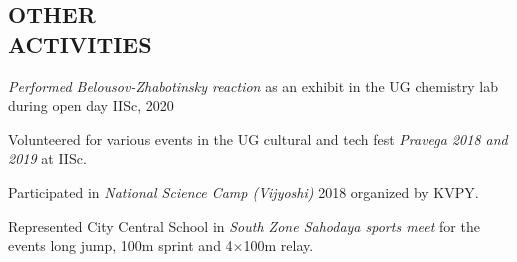 \documentclass[margin, 10pt]{res} %
\begin{document}
\begin{resume}
\section{OTHER \\ ACTIVITIES} 
{\it Performed Belousov-Zhabotinsky reaction} as an exhibit
in the UG chemistry lab during open day IISc, 2020

\smallskip

Volunteered for various events in the UG cultural and
tech fest {\it Pravega 2018 and 2019} at IISc.

\smallskip

Participated in {\it National Science Camp (Vijyoshi)} 2018
organized by KVPY.

\smallskip

Represented City Central School in {\it South Zone Sahodaya sports meet}
for the events long jump, 100m sprint and 4$\times$100m relay.


\end{resume}
\end{document}
